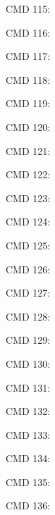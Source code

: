 \documentclass[a4paper,fleqn]{cas-dc}
\begin{document}
CMD 115: \citep{ragflow2024}\par
CMD 116: \citep{yang2018hotpotqa}\par
CMD 117: \citep{reddy2019coqa}\par
CMD 118: \citep{hendrycks2021mmlu}\par
CMD 119: \citep{trivedi2022musique}\par
CMD 120: \citep{liu2024agentbench}\par
CMD 121: \citep{mialon2024gaia}\par
CMD 122: \citep{zhou2024webarena}\par
CMD 123: \citep{autorag2024}\par
CMD 124: \citep{zhang2024eduplanner}\par
CMD 125: \citep{fatemi2024financialqa}\par
CMD 126: \citep{qian2024scaling_multiagent}\par
CMD 127: \citep{hendrycks2021mmlu,yang2018hotpotqa,liu2024agentbench,mialon2024gaia}\par
CMD 128: \citep{han2024mast}\par
CMD 129: \citep{tang2024medagents,cui2023chatlaw}\par
CMD 130: \citep{duan2024langgraph_crewai,
langgraph2024interrupt}\par
CMD 131: \citep{wu2024autogen,langgraph2024,crewai2023,dify2024}\par
CMD 132: \citep{kim2024mdagents}\par
CMD 133: \citep{qian2024scaling_multiagent}\par
CMD 134: \citep{han2024mast}\par
CMD 135: \citep{zhang2024memory_survey,shinn2023reflexion}\par
CMD 136: \citep{park2023generative_agents,chen2024agentverse}\par
\printbibliography
\end{document}

